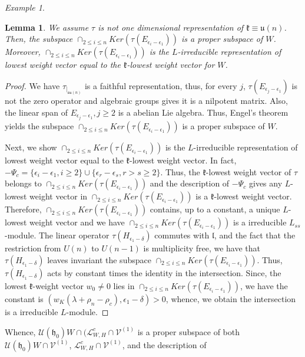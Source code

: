 \documentclass[12pt]{amsart}
\newtheorem{lem}[thm]{Lemma}
\theoremstyle{definition}
\theoremstyle{remark}
\newtheorem{examp}[thm]{Example}
\newcommand{\h}{\mathfrak{h}}
\renewcommand{\k}{{\mathfrak k}}
\renewcommand{\l}{\mathfrak l}
\numberwithin{equation}{section}
\begin{document}
\begin{examp}
\begin{lem} \label{prop:engel} We assume
   $\tau$ is not one dimensional representation of $\k\equiv \mathfrak{u}(n)$. Then, the subspace $ \cap_{2\leq i\leq n} Ker(\tau(E_{\epsilon_i -\epsilon_1})) $ is a proper subspace of $W$. Moreover,    $ \cap_{2\leq i\leq n} Ker(\tau(E_{\epsilon_i -\epsilon_1})) $ is the $L$-irreducible representation of lowest weight vector equal to the $\k$-lowest weight vector for $W$.
\end{lem}


\begin{proof}
    We have $\tau_{\vert_{\mathfrak{su}(n)}}$ is a faithful representation, thus, for every $j$,  $\tau(E_{\epsilon_j -\epsilon_1})$ is not the zero operator and algebraic groups gives it is a nilpotent matrix. Also, the linear span of $E_{\epsilon_j -\epsilon_1}, j\geq 2$ is a abelian Lie algebra. Thus, Engel's theorem yields the subspace $ \cap_{2\leq i\leq n} Ker(\tau(E_{\epsilon_i -\epsilon_1})) $ is a proper subspace of $W$.

 Next, we show $ \cap_{2\leq i\leq n} Ker(\tau(E_{\epsilon_i -\epsilon_1})) $ is the $L$-irreducible representation of lowest weight vector equal to the $\k$-lowest weight vector. In fact, $-\Psi_c=\{ \epsilon_i -\epsilon_1, i\geq 2\}\cup \{ \epsilon_r -\epsilon_s,   r >s \geq 2 \}$. Thus, the $\k$-lowest weight vector of $\tau$ belongs to  $ \cap_{2\leq i\leq n} Ker(\tau(E_{\epsilon_i -\epsilon_1})) $ and the description of $-\Psi_c$ gives  any $L$-lowest weight vector in  $ \cap_{2\leq i\leq n} Ker(\tau(E_{\epsilon_i -\epsilon_1})) $ is a $\k$-lowest weight vector. Therefore,  $ \cap_{2\leq i\leq n} Ker(\tau(E_{\epsilon_i -\epsilon_1})) $ contains, up to a constant, a unique $L$-lowest weight vector and we have  $ \cap_{2\leq i\leq n} Ker(\tau(E_{\epsilon_i -\epsilon_1})) $ is a irreducible $L_{ss}$-module. The linear operator $\tau(H_{\epsilon_1 -\delta})$ commutes with $\l$, and the fact that the restriction from $U(n)$ to $U(n-1)$   is multiplicity free, we have that $\tau(H_{\epsilon_1 -\delta})$ leaves invariant the subspace  $ \cap_{2\leq i\leq n} Ker(\tau(E_{\epsilon_i -\epsilon_1})) $. Thus, $\tau(H_{\epsilon_1 -\delta})$ acts by constant times the identity in the intersection. Since, the lowest $\k$-weight vector $w_0 \not= 0$ lies in   $ \cap_{2\leq i\leq n} Ker(\tau(E_{\epsilon_i -\epsilon_1})) $, we have the constant is $(w_K(\lambda +\rho_n-\rho_c), \epsilon_1 -\delta)>0$, whence,  we obtain the intersection is a irreducible $L$-module.  \end{proof} Whence,  $\mathcal U(\h_0)W\cap  (\mathcal L_{W,H}^c  \cap \mathcal V^{(1)}$  is a proper subspace of both $ \mathcal U(\h_0)W\cap \mathcal V^{(1)}$, $  \mathcal L_{W,H}^c  \cap \mathcal V^{(1)}$,  and the  description of


\end{examp}
\end{document}
